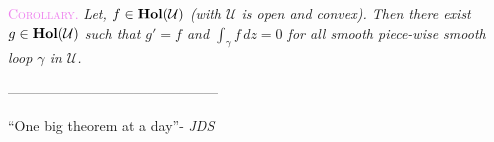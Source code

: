 \documentclass[../ComplexAnalysis_Notes.tex]{subfiles}
\begin{document}
\vspace*{0.2cm} %

\hspace*{0.6cm} \textcolor{violet}{\textsc{Corollary}.} \textit{Let, $f\in \operatorname{\mathbf{Hol}} (\mathcal{U})$ (with $\mathcal{U}$ is open and convex). Then there exist $ g \in \operatorname{\mathbf{Hol}} (\mathcal{U})$ such that $g'=f$ and $\int_{\gamma} f\, dz =0$ for all smooth piece-wise smooth loop $\gamma$ in $\mathcal{U}$.}



\begin{center}
    ---------------------------------------------

    ``\textcolor{darkcerulean}{One big theorem at a day}''- \textit{JDS}
\end{center}
\end{document}

